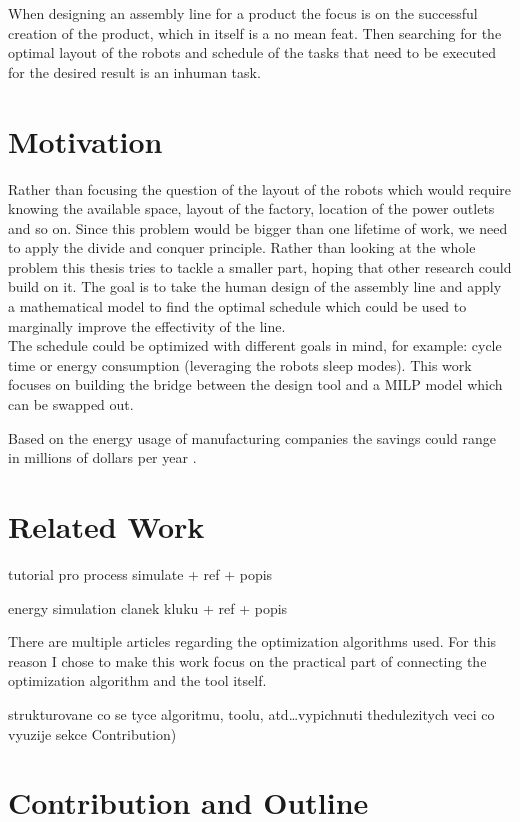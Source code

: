 When designing an assembly line for a product the focus is on the successful creation of the product, which in itself is a no mean feat. Then searching for the optimal layout of the robots and schedule of the tasks that need to be executed for the desired result is an inhuman task. 

\section{Motivation}

Rather than focusing the question of the layout of the robots which would require knowing the available space, layout of the factory, location of the power outlets and so on. Since this problem would be bigger than one lifetime of work, we need to apply the divide and conquer principle. Rather than looking at the whole problem this thesis tries to tackle a smaller part, hoping that other research could build on it. The goal is to take the human design of the assembly line and apply a mathematical model to find the optimal schedule which could be used to marginally improve the effectivity of the line. \\

The schedule could be optimized with different goals in mind, for example: cycle time or energy consumption (leveraging the robots sleep modes). This work focuses on building the bridge between the design tool and a MILP model which can be swapped out. 

Based on the energy usage of manufacturing companies the savings could range in millions of dollars per year \cite{GMEnergySpending}.

\section{Related Work}

tutorial pro process simulate + ref + popis

energy simulation clanek kluku + ref + popis

 

There are multiple articles regarding the optimization algorithms used. For this reason I chose to make this work focus on the practical part of connecting the optimization algorithm and the tool itself.


strukturovane co se tyce algoritmu, toolu, atd\ldots vypichnuti thedulezitych veci co vyuzije sekce Contribution)

\section{Contribution and Outline}

